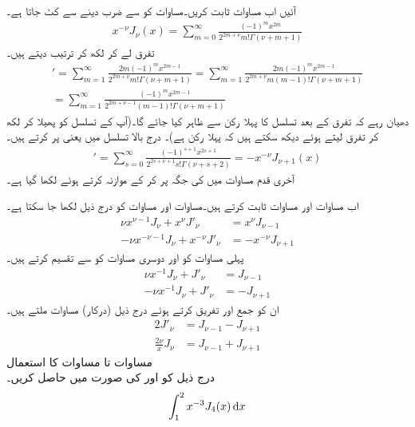 آئیں اب مساوات  ثابت کریں۔مساوات  کو  سے ضرب دینے سے  کٹ جاتا ہے۔
\begin{align*}
x^{-\nu}J_{\nu}(x)=\sum_{m=0}^{\infty}\frac{(-1)^m x^{2m}}{2^{2m+\nu}m!\Gamma(\nu+m+1)}
\end{align*}
تفرق لے کر  لکھ کر ترتیب دیتے ہیں۔
\begin{align*}
[x^{-\nu}J_{\nu}(x)]'=\sum_{m=1}^{\infty}\frac{2m(-1)^m x^{2m-1}}{2^{2m+\nu}m!\Gamma(\nu+m+1)}=\sum_{m=1}^{\infty}\frac{2m(-1)^m x^{2m-1}}{2^{2m+\nu}m(m-1)!\Gamma(\nu+m+1)}\\
=\sum_{m=1}^{\infty}\frac{(-1)^m x^{2m-1}}{2^{2m+\nu-1}(m-1)!\Gamma(\nu+m+1)}
\end{align*}
دھیان رہے کہ تفرق کے بعد تسلسل کا پہلا رکن  سے ظاہر کیا جائے گا۔(آپ  کے تسلسل کو پھیلا کر لکھ کر تفرق لیتے ہوئے دیکھ سکتے ہیں کہ پہلا رکن  ہے)۔ درج بالا تسلسل میں  یعنی  پر کرتے ہیں۔
\begin{align*}
[x^{-\nu}J_{\nu}(x)]'=\sum_{s=0}^{\infty}\frac{(-1)^{s+1} x^{2s+1}}{2^{2s+\nu+1}s!\Gamma(\nu+s+2)}=-x^{-\nu}J_{\nu+1}(x)
\end{align*}
آخری قدم مساوات  میں  کی جگہ  پر کر کے موازنہ کرتے ہوئے لکھا گیا ہے۔

اب مساوات  اور مساوات  ثابت کرتے ہیں۔مساوات  اور مساوات  کو درج ذیل لکھا جا سکتا ہے۔
\begin{align*}
\nu x^{\nu-1} J_{\nu}+x^{\nu}J'_{\nu}&=x^{\nu} J_{\nu-1}\\
-\nu x^{-\nu-1} J_{\nu}+x^{-\nu}J'_{\nu}&=-x^{-\nu} J_{\nu+1}
\end{align*}
پہلی مساوات کو  اور دوسری مساوات کو  سے تقسیم کرتے ہیں۔
\begin{align*}
\nu x^{-1} J_{\nu}+J'_{\nu}&= J_{\nu-1}\\
-\nu x^{-1} J_{\nu}+J'_{\nu}&=-J_{\nu+1}
\end{align*}
ان کو جمع اور تفریق کرتے ہوئے درج ذیل (درکار) مساوات ملتے ہیں۔
\begin{align*}
2J'_{\nu}&=J_{\nu-1}-J_{\nu+1}\\
\frac{2\nu}{x}J_{\nu}&=J_{\nu-1}+J_{\nu+1}
\end{align*}
\quad مساوات  تا مساوات  کا استعمال\\
درج ذیل کو  اور  کی صورت میں حاصل کریں۔
\begin{align*}
\int_{1}^{2} x^{-3}J_4(x)\dif x
\end{align*}

